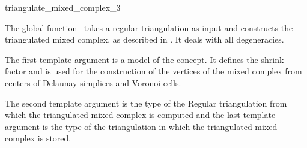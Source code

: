 

\begin{ccRefFunction}{triangulate_mixed_complex_3}

\ccDefinition The global function \ccRefName\ takes a regular
triangulation as input and constructs the triangulated mixed
complex, as described in \cite{cgal:kv-mssct-05}. It deals with all
degeneracies.



\ccParameters 
%
The first template argument  is a model of
the  concept. It defines the shrink factor
and is used for the construction of the vertices of the mixed complex
from centers of Delaunay simplices and Voronoi cells.

The second template argument is the type of the Regular triangulation
from which the triangulated mixed complex is computed and the last
template argument is the type of the triangulation in which the
triangulated mixed complex is stored. 

\ccThreeToTwo




\end{ccRefFunction}


